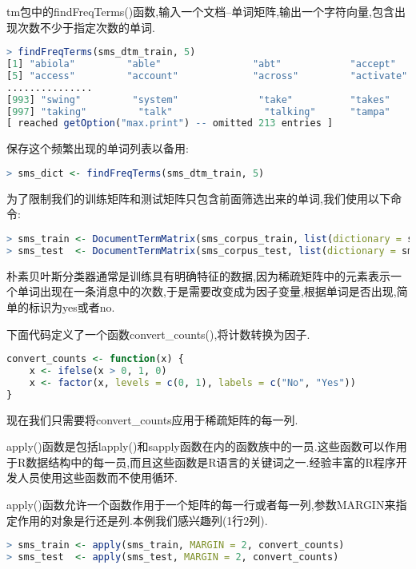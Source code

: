 \documentclass[11pt,a4paper,oneside]{book}
\begin{document}
tm包中的findFreqTerms()函数,输入一个文档--单词矩阵,输出一个字符向量,包含出现次数不少于指定次数的单词.
\begin{lstlisting}[language=r]
> findFreqTerms(sms_dtm_train, 5)
[1] "abiola"         "able"                "abt"            "accept"             
[5] "access"         "account"             "across"         "activate"           
...............                          
[993] "swing"         "system"              "take"          "takes"              
[997] "taking"         "talk"                "talking"      "tampa"              
[ reached getOption("max.print") -- omitted 213 entries ]
\end{lstlisting}

保存这个频繁出现的单词列表以备用:
\begin{lstlisting}[language=r]
> sms_dict <- findFreqTerms(sms_dtm_train, 5)
\end{lstlisting}

为了限制我们的训练矩阵和测试矩阵只包含前面筛选出来的单词,我们使用以下命令:
\begin{lstlisting}[language=r]
> sms_train <- DocumentTermMatrix(sms_corpus_train, list(dictionary = sms_dict))
> sms_test  <- DocumentTermMatrix(sms_corpus_test, list(dictionary = sms_dict))
\end{lstlisting}

朴素贝叶斯分类器通常是训练具有明确特征的数据,因为稀疏矩阵中的元素表示一个单词出现在一条消息中的次数,于是需要改变成为因子变量,根据单词是否出现,简单的标识为yes或者no.

下面代码定义了一个函数convert\_counts(),将计数转换为因子.
\begin{lstlisting}[language=r]
convert_counts <- function(x) {
	x <- ifelse(x > 0, 1, 0)
	x <- factor(x, levels = c(0, 1), labels = c("No", "Yes"))
}
\end{lstlisting}

现在我们只需要将convert\_counts应用于稀疏矩阵的每一列.
\begin{tcolorbox}[colback=pink!10!white,colframe=pink!100!black]
apply()函数是包括lapply()和sapply函数在内的函数族中的一员.这些函数可以作用于R数据结构中的每一员,而且这些函数是R语言的关键词之一.经验丰富的R程序开发人员使用这些函数而不使用循环.
\end{tcolorbox}
apply()函数允许一个函数作用于一个矩阵的每一行或者每一列,参数MARGIN来指定作用的对象是行还是列.本例我们感兴趣列(1行2列).
\begin{lstlisting}[language=r]
> sms_train <- apply(sms_train, MARGIN = 2, convert_counts)
> sms_test  <- apply(sms_test, MARGIN = 2, convert_counts)
\end{lstlisting}
\end{document}
